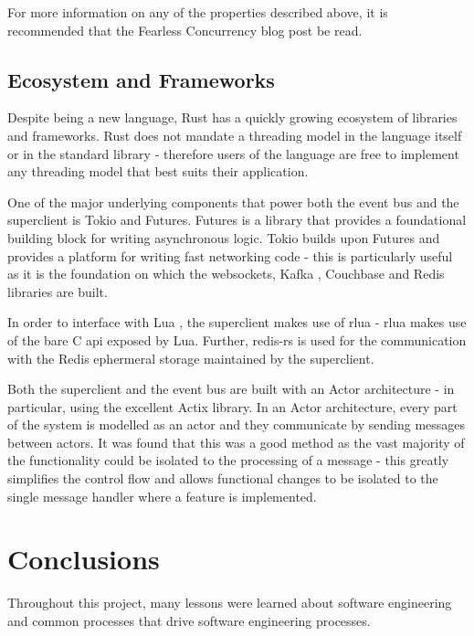 \documentclass{l3proj}
\begin{document}
For more information on any of the properties described above, it is recommended that the Fearless Concurrency \cite{fearless_concurrency} blog post be read.

\subsection{Ecosystem and Frameworks}
Despite being a new language, Rust has a quickly growing ecosystem of libraries and frameworks. Rust does not mandate a threading model in the language itself or in the standard library - therefore users of the language are free to implement any threading model that best suits their application.

One of the major underlying components that power both the event bus and the superclient is Tokio \cite{tokio} and Futures. Futures is a library that provides a foundational building block for writing asynchronous logic. Tokio builds upon Futures and provides a platform for writing fast networking code - this is particularly useful as it is the foundation on which the websockets, Kafka \cite{kafka}, Couchbase \cite{couchbase} and Redis \cite{redis} libraries are built.

In order to interface with Lua \cite{lua}, the superclient makes use of rlua \cite{rlua} - rlua makes use of the bare C api exposed by Lua. Further, redis-rs \cite{redis-rs} is used for the communication with the Redis ephermeral storage maintained by the superclient.

Both the superclient and the event bus are built with an Actor architecture - in particular, using the excellent Actix \cite{actix} library. In an Actor architecture, every part of the system is modelled as an actor and they communicate by sending messages between actors. It was found that this was a good method as the vast majority of the functionality could be isolated to the processing of a message - this greatly simplifies the control flow and allows functional changes to be isolated to the single message handler where a feature is implemented.

\section{Conclusions}
\label{sec:conclusions}
Throughout this project, many lessons were learned about software engineering and common processes that drive software engineering processes.
\end{document}
